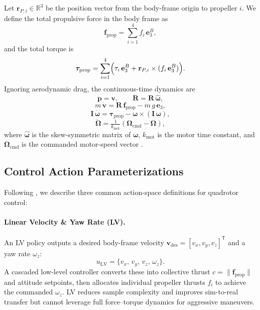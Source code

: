 Let \(\mathbf{r}_{P,i}\in \mathbb{R}^{3}\) be the position vector from the body-frame origin to propeller \(i\). We define the total propulsive force in the body frame as
\begin{equation}
\mathbf{f}_{\mathrm{prop}} = \sum_{i=1}^4 f_i\,\mathbf{e}_3^B,
\end{equation}
and the total torque is
\begin{equation}
\boldsymbol{\tau}_{\mathrm{prop}} = \sum_{i=1}^4 \Bigl(\tau_i\,\mathbf{e}_3^B + \mathbf{r}_{P,i}\times(f_i\,\mathbf{e}_3^B)\Bigr).
\end{equation}
Ignoring aerodynamic drag, the continuous-time dynamics are
\begin{equation}
\dot{\mathbf{p}} = \mathbf{v}, 
\qquad
\dot{\mathbf{R}} = \mathbf{R}\,\widehat{\boldsymbol{\omega}},
\end{equation}
\begin{equation}
m\,\dot{\mathbf{v}} = \mathbf{R}\,\mathbf{f}_{\mathrm{prop}} - m\,g\,\mathbf{e}_3,
\end{equation}
\begin{equation}
\mathbf{I}\,\dot{\boldsymbol{\omega}} = \boldsymbol{\tau}_{\mathrm{prop}} - \boldsymbol{\omega} \times (\mathbf{I}\,\boldsymbol{\omega}),
\end{equation}
\begin{equation}
\dot{\boldsymbol{\Omega}} = \tfrac{1}{k_{\mathrm{mot}}}(\boldsymbol{\Omega}_{\mathrm{cmd}} - \boldsymbol{\Omega}),
\end{equation}
where \(\widehat{\boldsymbol{\omega}}\) is the skew-symmetric matrix of \(\boldsymbol{\omega}\), \(k_{\mathrm{mot}}\) is the motor time constant, and \(\boldsymbol{\Omega}_{\mathrm{cmd}}\) is the commanded motor-speed vector \cite{kaufmann_benchmark_2022}.

\subsection{Control Action Parameterizations}
\label{sec:quadrotor_actions}
Following \cite{kaufmann_benchmark_2022}, we describe three common action-space definitions for quadrotor control:

\paragraph{Linear Velocity \& Yaw Rate (LV).}  
An LV policy outputs a desired body-frame velocity \(\mathbf{v}_{\mathrm{des}}=[v_x,v_y,v_z]^\mathsf{T}\) and a yaw rate \(\omega_z\):
\begin{equation}
u_{\mathrm{LV}} = \{v_x,\,v_y,\,v_z,\,\omega_z\}.
\end{equation}
A cascaded low-level controller converts these into collective thrust \(c=\|\mathbf{f}_{\mathrm{prop}}\|\) and attitude setpoints, then allocates individual propeller thrusts \(f_i\) to achieve the commanded \(\omega_z\). LV reduces sample complexity and improves sim-to-real transfer but cannot leverage full force–torque dynamics for aggressive maneuvers.


